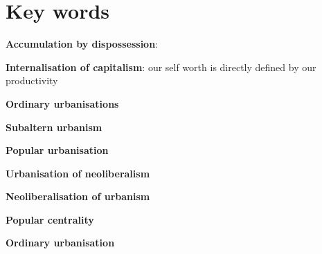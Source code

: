 \documentclass{article}
\begin{document}
\pagebreak
\section{Key words}

\textbf{Accumulation by dispossession}:

\textbf{Internalisation of capitalism}: our self worth is directly defined by our productivity

\textbf{Ordinary urbanisations}

\textbf{Subaltern urbanism}

\textbf{Popular urbanisation}

\textbf{Urbanisation of neoliberalism}

\textbf{Neoliberalisation of urbanism}

\textbf{Popular centrality}

\textbf{Ordinary urbanisation}

\textbf{}

\textbf{}
\fi
\end{document}
